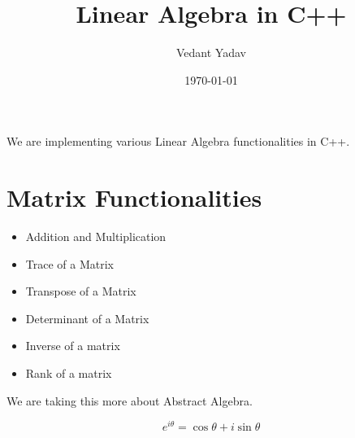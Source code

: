 \documentclass[12pt, letterpaper]{article}
\title{Linear Algebra in C++}
\author{Vedant Yadav}
\date{\today}
\begin{document}
\maketitle
We are implementing various Linear Algebra functionalities  in C++.
\section{Matrix Functionalities}
\begin{itemize}
	\item Addition and Multiplication
	\item Trace of a Matrix
	\item Transpose of a Matrix
	\item Determinant of a Matrix
	\item Inverse of a matrix
	\item Rank of a matrix
\end{itemize}

We are taking this more about Abstract Algebra. 

\begin{equation}
	e^{i\theta} = \cos\theta + i \sin\theta
\end{equation}
\end{document}

